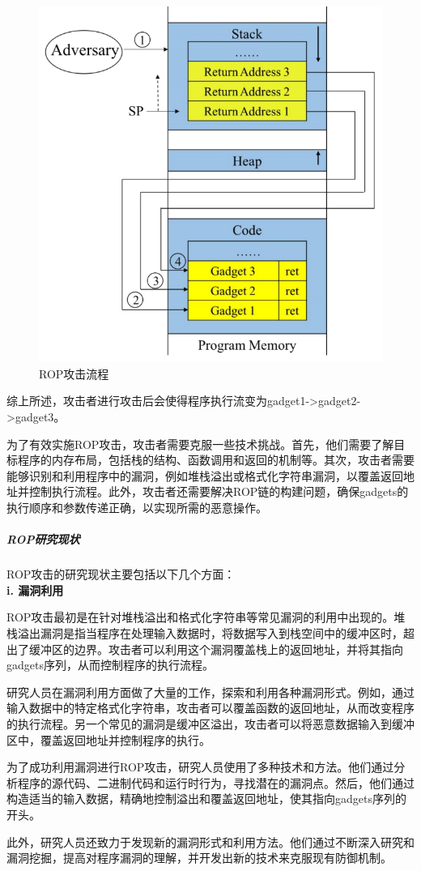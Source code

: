 \documentclass[UTF8,12pt,a4paper,twoside]{ctexart}
\numberwithin{figure}{section}
\begin{document}
\begin{figure}
    \centering
    \includegraphics[scale=0.35]{graph/ROP.png}
    \caption{ROP攻击流程}
    \label{ROP}
\end{figure}
综上所述，攻击者进行攻击后会使得程序执行流变为gadget1->gadget2->gadget3。

\par 为了有效实施ROP攻击，攻击者需要克服一些技术挑战。首先，他们需要了解目标程序的内存布局，包括栈的结构、函数调用和返回的机制等。其次，攻击者需要能够识别和利用程序中的漏洞，例如堆栈溢出或格式化字符串漏洞，以覆盖返回地址并控制执行流程。此外，攻击者还需要解决ROP链的构建问题，确保gadgets的执行顺序和参数传递正确，以实现所需的恶意操作。

\subparagraph{ROP研究现状}
ROP攻击的研究现状主要包括以下几个方面：\\
\textbf{i. 漏洞利用}
\par ROP攻击最初是在针对堆栈溢出和格式化字符串等常见漏洞的利用中出现的。堆栈溢出漏洞是指当程序在处理输入数据时，将数据写入到栈空间中的缓冲区时，超出了缓冲区的边界。攻击者可以利用这个漏洞覆盖栈上的返回地址，并将其指向gadgets序列，从而控制程序的执行流程。
\par 研究人员在漏洞利用方面做了大量的工作，探索和利用各种漏洞形式。例如，通过输入数据中的特定格式化字符串，攻击者可以覆盖函数的返回地址，从而改变程序的执行流程。另一个常见的漏洞是缓冲区溢出，攻击者可以将恶意数据输入到缓冲区中，覆盖返回地址并控制程序的执行。
\par 为了成功利用漏洞进行ROP攻击，研究人员使用了多种技术和方法。他们通过分析程序的源代码、二进制代码和运行时行为，寻找潜在的漏洞点。然后，他们通过构造适当的输入数据，精确地控制溢出和覆盖返回地址，使其指向gadgets序列的开头。
\par 此外，研究人员还致力于发现新的漏洞形式和利用方法。他们通过不断深入研究和漏洞挖掘，提高对程序漏洞的理解，并开发出新的技术来克服现有防御机制。\\
\end{document}
